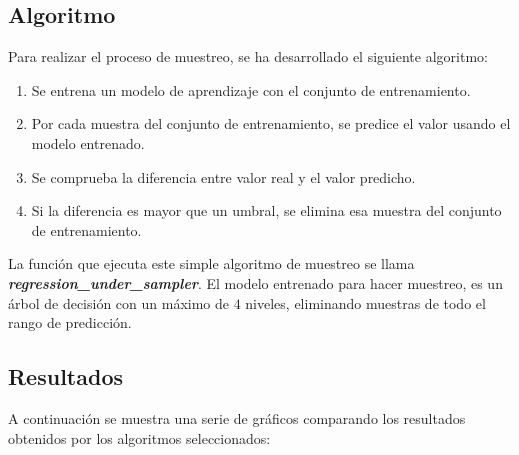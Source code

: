 \subsection{Algoritmo}
Para realizar el proceso de muestreo, se ha desarrollado el siguiente algoritmo:
\begin{enumerate}
	\item Se entrena un modelo de aprendizaje con el conjunto de entrenamiento.
	\item Por cada muestra del conjunto de entrenamiento, se predice el valor usando el modelo entrenado.
	\item Se comprueba la diferencia entre valor real y el valor predicho.
	\item Si la diferencia es mayor que un umbral, se elimina esa muestra del conjunto de entrenamiento.
\end{enumerate}
La función que ejecuta este simple algoritmo de muestreo se llama \textit{\textbf{regression\_under\_sampler}}.
\linebreak
El modelo entrenado para hacer muestreo, es un árbol de decisión con un máximo de $4$ niveles, eliminando muestras de todo el rango de predicción.
\subsection{Resultados}
A continuación se muestra una serie de gráficos comparando los resultados obtenidos por los algoritmos seleccionados:
